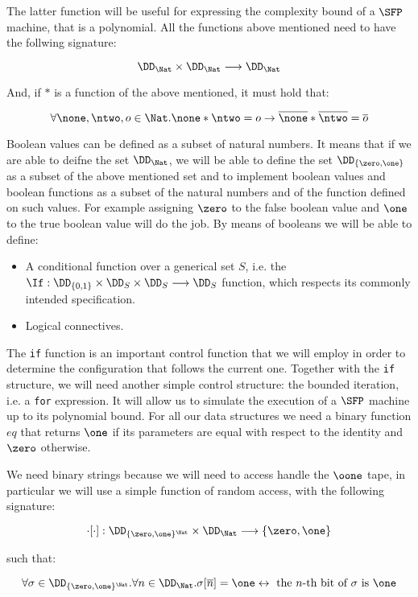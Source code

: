 The latter function will be useful for expressing the complexity bound of a $\SFP$ machine, that is a polynomial. All the functions above mentioned need to have the follwing signature:

$$
\DD_\Nat \times \DD_\Nat \longrightarrow \DD_\Nat
$$

And, if $*$ is a function of the above mentioned, it must hold that:

$$
\forall \none, \ntwo, o \in \Nat. \none *\ntwo = o \to \overline \none *\overline \ntwo = \overline o
$$


Boolean values can be defined as a subset of natural numbers. It means that if we are able to deifne the set $\DD_\Nat$, we will be able to define the set $\DD_{\{\zero, \one\}}$ as a subset of the above mentioned set and to implement boolean values and boolean functions as a subset of the natural numbers and of the function defined on such values. For example assigning $\zero$ to the false boolean value and $\one$ to the true boolean value will do the job. By means of booleans we will be able to define:

\begin{itemize}
\item A conditional function over a generical set $S$, i.e. the $\If: \DD_{\{0, 1\}}\times \DD_S \times \DD_S \longrightarrow \DD_S$ function, which respects its commonly intended specification.
\item Logical connectives.
\end{itemize}

The \texttt{if} function is an important control function that we will employ in order to determine the configuration that follows the current one. Together with the \texttt{if} structure, we will need another simple control structure: the bounded iteration, i.e. a \texttt{for} expression. It will allow us to simulate the execution of a $\SFP$ machine up to its polynomial bound. For all our data structures we need a binary function $eq$ that returns $\one$ if its parameters are equal with respect to the identity and $\zero$ otherwise.

We need binary strings because we will need to access handle the $\oone$ tape, in particular we will use a simple function of random access, with the following signature:

$$
\cdot[\cdot]: \DD_{\{\zero, \one\}^\Nat} \times \DD_\Nat \longrightarrow \{\zero, \one\}
$$

such that:

$$
\forall \sigma \in \DD_{\{\zero, \one\}^\Nat}.\forall n \in \DD_\Nat. \sigma[\overline n] = \one \leftrightarrow \text{ the $n$-th bit of $\sigma$ is $\one$}
$$

